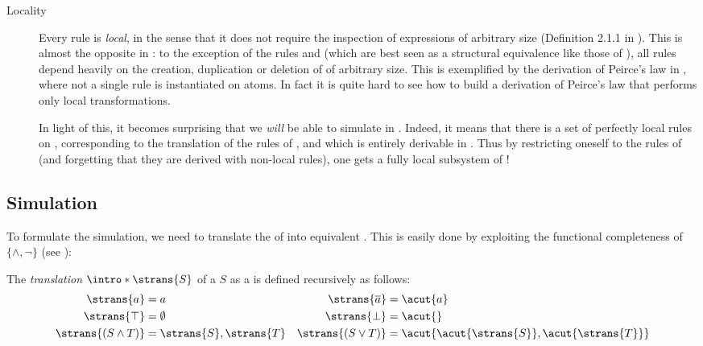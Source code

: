 \begin{scope}
\begin{scope}
\begin{description}
  \item[Locality]
    Every rule is \emph{local}, in the sense that it does not require the
    inspection of expressions of arbitrary size (Definition 2.1.1 in
    \cite{tubella:hal-02390267}). This is almost the opposite in : to
    the exception of the rules  and  (which are best
    seen as a structural equivalence like those of ), all rules depend
    heavily on the creation, duplication or deletion of  of
    arbitrary size. This is exemplified by the derivation of Peirce's law in
    , where not a single rule is instantiated on atoms. In
    fact it is quite hard to see how to build a derivation of Peirce's law that
    performs only local transformations.
    
    In light of this, it becomes surprising that we \emph{will} be able to
    simulate  in . Indeed, it means that there is a set
     of perfectly local rules on , corresponding to the
    translation of the rules of , and which is entirely derivable in
    . Thus by restricting oneself to the rules of 
    (and forgetting that they are derived with non-local rules), one gets a
    fully local subsystem of !
\end{description}

\subsection{Simulation}

To formulate the simulation, we need to translate the  of 
into equivalent . This is easily done by exploiting the
functional completeness of $\{\land, \neg\}$ (see ):

\begin{definition}
  The \emph{translation} $\intro*\strans{S}$ of a  $S$ as a  is
  defined recursively as follows:
  \begin{align*}
    \strans{a} &= a & \strans{\dmdual{a}} &= \acut{a} \\
    \strans{\top} &= \emptyset & \strans{\bot} &= \acut{} \\
    \strans{(S \land T)} &= \strans{S}, \strans{T} & \strans{(S \lor T)} &= \acut{\acut{\strans{S}}, \acut{\strans{T}}}
  \end{align*}
\end{definition}


\end{scope}
\end{scope}
